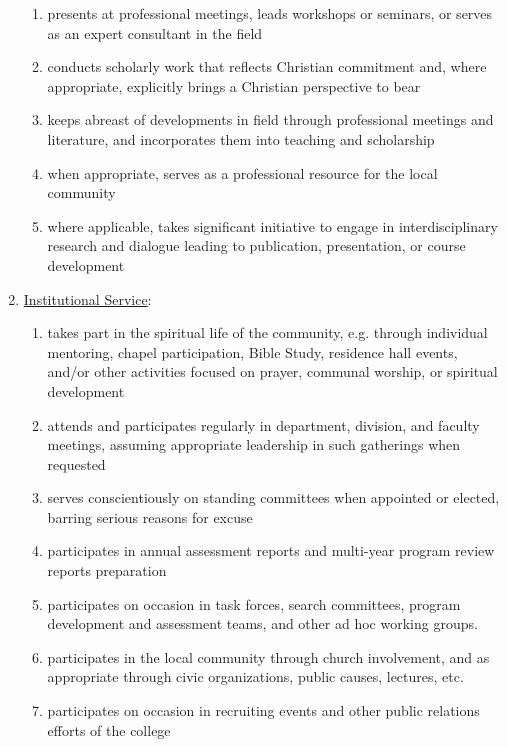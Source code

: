 \begin{enumerate}[label=\alph*)]
{\begin{enumerate}[label=\arabic*)]
							\item{presents at professional meetings, leads workshops or seminars, or serves as an expert consultant in the field}
							\item{conducts scholarly work that reflects Christian commitment and, where appropriate, explicitly brings a Christian perspective to bear}
							\item{keeps abreast of developments in field through professional meetings and literature, and incorporates them into teaching and scholarship}
							\item{when appropriate, serves as a professional resource for the local community}
							\item{where applicable, takes significant initiative to engage in interdisciplinary research and dialogue leading to publication, presentation, or course development}
						\end{enumerate}
					}
					\item{\underline{Institutional Service}:
						\begin{enumerate}[label=\arabic*)]
							\item{takes part in the spiritual life of the community, e.g. through individual mentoring, chapel participation, Bible Study, residence hall events, and/or other activities focused on prayer, communal worship, or spiritual development}
							\item{attends and participates regularly in department, division, and faculty meetings, assuming appropriate leadership in such gatherings when requested}
							\item{serves conscientiously on standing committees when appointed or elected, barring serious reasons for excuse}
							\item{participates in annual assessment reports and multi-year program review reports preparation}
							\item{participates on occasion in task forces, search committees, program development and assessment teams, and other ad hoc working groups.}
							\item{participates in the local community through church involvement, and as appropriate through civic organizations, public causes, lectures, etc.}
							\item{participates on occasion in recruiting events and other public relations efforts of the college}
						\end{enumerate}
					}
				\end{enumerate}

